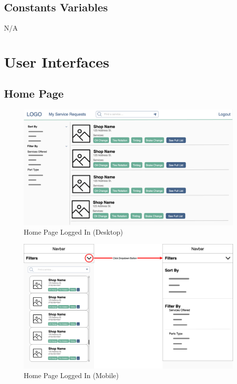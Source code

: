 \documentclass[12pt, titlepage]{article}
\begin{document}
\subsection{Constants Variables}
N/A

\section{User Interfaces}


\subsection{Home Page}

\begin{figure}[H]
	\centering
	\includegraphics[width=\textwidth]{mockups/Home Page (Logged In) (Desktop).png}
	\caption{Home Page \textemdash{} Logged In (Desktop)}
\end{figure}

\begin{figure}[H]
	\centering
	\includegraphics[width=\textwidth]{mockups/Home Page (Mobile).png}
	\caption{Home Page \textemdash{} Logged In (Mobile)}
\end{figure}
\end{document}
